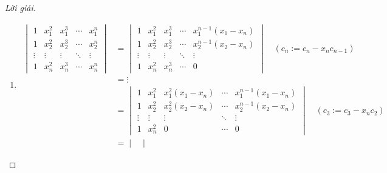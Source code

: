 \documentclass[class=linearalgebra,crop=false]{standalone}
\begin{document}
\begin{proof}[Lời giải]
    \begin{enumerate}[label = (\alph*)]
        \item
              \begin{align*}
                  \begin{vmatrix}
                      1      & x_{1}^{2} & x_{1}^{3} & \cdots & x_{1}^{n} \\
                      1      & x_{2}^{2} & x_{2}^{3} & \cdots & x_{2}^{n} \\
                      \vdots & \vdots    & \vdots    & \ddots & \vdots    \\
                      1      & x_{n}^{2} & x_{n}^{3} & \cdots & x_{n}^{n}
                  \end{vmatrix}
                   & =
                  \begin{vmatrix}
                      1      & x_{1}^{2} & x_{1}^{3} & \cdots & x_{1}^{n-1}(x_{1} - x_{n}) \\
                      1      & x_{2}^{2} & x_{2}^{3} & \cdots & x_{2}^{n-1}(x_{2} - x_{n}) \\
                      \vdots & \vdots    & \vdots    & \ddots & \vdots                     \\
                      1      & x_{n}^{2} & x_{n}^{3} & \cdots & 0
                  \end{vmatrix}\quad(c_{n}:= c_{n} - x_{n}c_{n-1})                                     \\
                   & = \vdots                                                                                              \\
                   & =
                  \begin{vmatrix}
                      1      & x_{1}^{2} & x_{1}^{2}(x_{1} - x_{n}) & \cdots & x_{1}^{n-1}(x_{1} - x_{n}) \\
                      1      & x_{2}^{2} & x_{2}^{2}(x_{2} - x_{n}) & \cdots & x_{2}^{n-1}(x_{2} - x_{n}) \\
                      \vdots & \vdots    & \vdots                   & \ddots & \vdots                     \\
                      1      & x_{n}^{2} & 0                        & \cdots & 0
                  \end{vmatrix}\quad(c_{3}:=c_{3} - x_{n}c_{2})                      \\
                   & =
                  \begin{vmatrix}

\end{vmatrix}
\end{align*}
\end{enumerate}
\end{proof}
\end{document}
